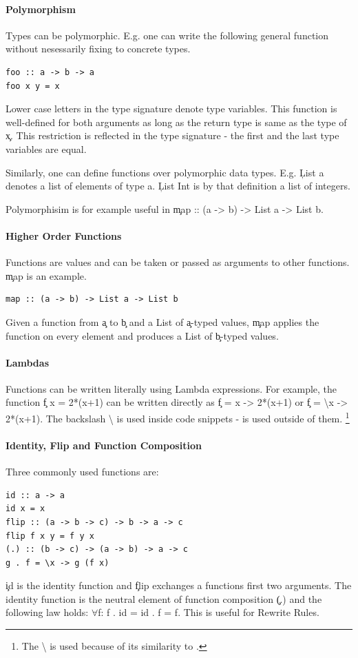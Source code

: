   \paragraph{Polymorphism}
    Types can be polymorphic. 
    E.g. one can write the following general function
    without nesessarily fixing to concrete types.
    \begin{lstlisting}
foo :: a -> b -> a
foo x y = x
    \end{lstlisting}
    Lower case letters in the type signature denote type variables.
    This function is well-defined for both arguments
    as long as the return type is same as the type of \c{x}. This
    restriction is reflected in the type signature - the first and
    the last type variables are equal. 
    
    Similarly, one can define functions over polymorphic data types.
    E.g. \c{List a} denotes a list of elements of type a. \c{List Int}
    is by that definition a list of integers.
    
    Polymorphisim is for example useful in \c{map :: (a -> b) -> List a -> List b}.
  
  \paragraph{Higher Order Functions}
    Functions are values and can be taken or passed as arguments to other functions.
    \c{map} is an example.
    \begin{lstlisting}
map :: (a -> b) -> List a -> List b
    \end{lstlisting}
    Given a function from \c{a} to \c{b} and a List of \c{a}-typed values,
    \c{map} applies the function on every element and produces a List
    of \c{b}-typed values.
    
  \paragraph{Lambdas}
    Functions can be written literally using Lambda expressions.
    For example, the function \c{f x = 2*(x+1)} can be written
    directly as \c{f = \lam x -> 2*(x+1)} or \c{f = \textbackslash{x} -> 2*(x+1)}.
    The backslash \textbackslash{} is used inside code snippets - \lam{} is used outside of them.
    \footnote{The \textbackslash{} is used because of its similarity to \lam.}
    
  \paragraph{Identity, Flip and Function Composition}
    Three commonly used functions are:
    \begin{lstlisting}
id :: a -> a
id x = x
flip :: (a -> b -> c) -> b -> a -> c
flip f x y = f y x
(.) :: (b -> c) -> (a -> b) -> a -> c
g . f = \x -> g (f x)
    \end{lstlisting}
    \c{id} is the identity function and \c{flip} exchanges a functions
    first two arguments.
    The identity function is the neutral element of function composition \c{(.)}
    and the following law holds:
     \c{\textrm{$\forall$}f: f . id = id . f = f}. This is useful for Rewrite Rules.


